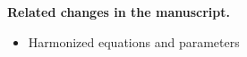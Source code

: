 \documentclass[pdflatex,sn-mathphys-num]{sn-jnl}
\newenvironment{relatedchanges}
  {\par\noindent\textbf{Related changes in the manuscript.}\begin{itemize}\small}
  {\end{itemize}}
\newcommand{\relhead}[1]{\item[]\vspace*{0.2\baselineskip}#1}
\begin{document}
\begin{relatedchanges}
\relhead{Harmonized equations and parameters}

\end{relatedchanges}
\end{document}
